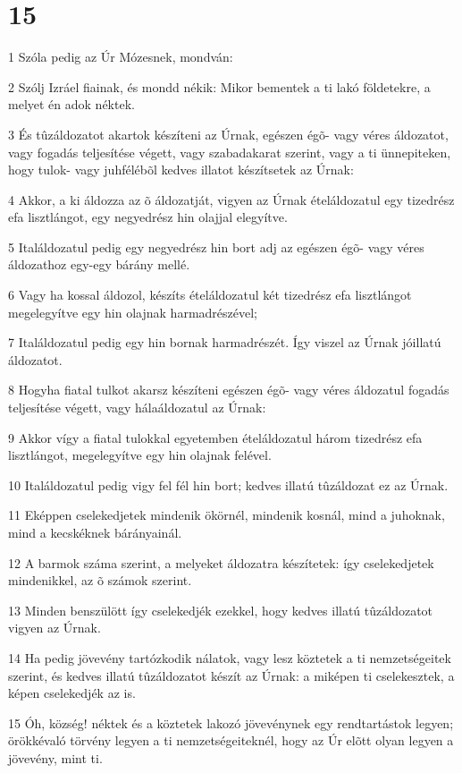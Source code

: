 \chapter{15}

\par 1 Szóla pedig az Úr Mózesnek, mondván:
\par 2 Szólj Izráel fiainak, és mondd nékik: Mikor bementek a ti lakó földetekre, a melyet én adok néktek.
\par 3 És tûzáldozatot akartok készíteni az Úrnak, egészen égõ- vagy véres áldozatot, vagy fogadás teljesítése végett, vagy szabadakarat szerint, vagy a ti ünnepiteken, hogy tulok- vagy juhfélébõl kedves illatot készítsetek az Úrnak:
\par 4 Akkor, a ki áldozza az õ áldozatját, vigyen az Úrnak ételáldozatul egy tizedrész efa lisztlángot, egy negyedrész hin olajjal elegyítve.
\par 5 Italáldozatul pedig egy negyedrész hin bort adj az egészen égõ- vagy véres áldozathoz egy-egy bárány mellé.
\par 6 Vagy ha kossal áldozol, készíts ételáldozatul két tizedrész efa lisztlángot megelegyítve egy hin olajnak harmadrészével;
\par 7 Italáldozatul pedig egy hin bornak harmadrészét. Így viszel az Úrnak jóillatú áldozatot.
\par 8 Hogyha fiatal tulkot akarsz készíteni egészen égõ- vagy véres áldozatul fogadás teljesítése végett, vagy hálaáldozatul az Úrnak:
\par 9 Akkor vígy a fiatal tulokkal egyetemben ételáldozatul három tizedrész efa lisztlángot, megelegyítve egy hin olajnak felével.
\par 10 Italáldozatul pedig vigy fel fél hin bort; kedves illatú tûzáldozat ez az Úrnak.
\par 11 Eképpen cselekedjetek mindenik ökörnél, mindenik kosnál, mind a juhoknak, mind a kecskéknek bárányainál.
\par 12 A barmok száma szerint, a melyeket áldozatra készítetek: így cselekedjetek mindenikkel, az õ számok szerint.
\par 13 Minden benszülött így cselekedjék ezekkel, hogy kedves illatú tûzáldozatot vigyen az Úrnak.
\par 14 Ha pedig jövevény tartózkodik nálatok, vagy lesz köztetek a ti nemzetségeitek szerint, és kedves illatú tûzáldozatot készít az Úrnak: a miképen ti cselekesztek, a képen cselekedjék az is.
\par 15 Óh, község! néktek és a köztetek lakozó jövevénynek egy rendtartástok legyen; örökkévaló törvény legyen a ti nemzetségeiteknél, hogy az Úr elõtt olyan legyen a jövevény, mint ti.
